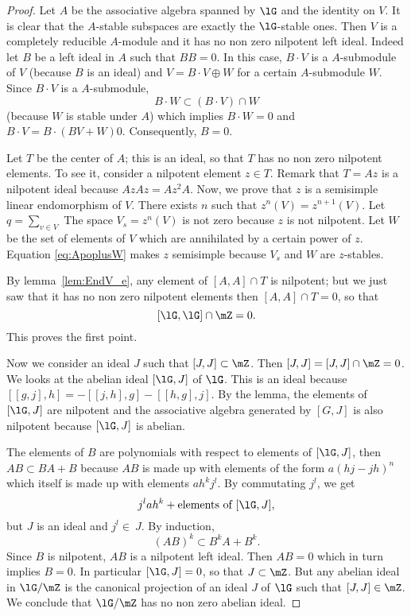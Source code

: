 \begin{proof}
	Let $A$ be the associative algebra spanned by $\lG$ and the identity on $V$. It is clear that the $A$-stable subspaces are exactly the $\lG$-stable ones. Then $V$ is a completely reducible $A$-module and it has no non zero nilpotent left ideal. Indeed let $B$ be a left ideal in $A$ such that $BB=0$. In this case, $B\cdot V$ is a $A$-submodule of $V$ (because $B$ is an ideal) and $V=B\cdot V\oplus W$ for a certain $A$-submodule $W$. Since $B\cdot V$ is a $A$-submodule,
	\[
		B\cdot W\subset(B\cdot V)\cap W
	\]
	(because $W$ is stable under $A$) which implies $B\cdot W=0$ and $B\cdot V=B\cdot(BV+W) 0$. Consequently, $B=0$.

	Let $T$ be the center of $A$; this is an ideal, so that $T$ has no non zero nilpotent elements. To see it, consider a nilpotent element $z\in T$. Remark that $T=Az$  is a nilpotent ideal because $AzAz=Az^2A$. Now, we prove that $z$ is a semisimple linear endomorphism of $V$. There exists \( n\) such that $z^n(V)=z^{n+1}(V)$. Let $q=\sum_{v\in V}$  The space $V_s=z^n(V)$ is not zero because $z$ is not nilpotent. Let $W$ be the set of elements of $V$ which are annihilated by a certain power of $z$. Equation \eqref{eq:ApoplusW} makes $z$ semisimple because $V_s$ and $W$ are $z$-stables.

	By lemma~\ref{lem:EndV_e}, any element of $[A,A]\cap T$ is nilpotent; but we just saw that it has no non zero nilpotent elements then $[A,A]\cap T=0$, so that
	\[
		[\lG,\lG]\cap\mZ=0.
	\]
	This proves the first point.

	Now we consider  an ideal $J$ such that $[J,J]\subset\mZ$. Then $[J,J]=[J,J]\cap \mZ=0$. We looks at the abelian ideal $[\lG,J]$ of $\lG$. This is an ideal because $[[g,j],h]=-[[j,h],g]-[[h,g],j]$. By the lemma, the elements of $[\lG,J]$ are nilpotent and the associative algebra generated by $[G,J]$ is also nilpotent because $[\lG,J]$ is abelian.

	The elements of $B$ are polynomials with respect to elements of $[\lG,J]$, then $AB\subset BA+B$ because $AB$ is made up with elements of the form $a(hj-jh)^n$ which itself is made up with elements $ah^kj^l$. By commutating $j^l$, we get
	\[
		j^lah^k+\text{elements of } [\lG,J],
	\]
	but $J$ is an ideal and $j^l\in\ J$. By induction,
	\begin{equation}
		(AB)^k\subset B^kA+B^k.
	\end{equation}
	Since $B$ is nilpotent, $AB$ is a nilpotent left ideal. Then $AB=0$ which in turn implies $B=0$. In particular $[\lG,J]=0$, so that $J\subset\mZ$. But any abelian ideal in $\lG/\mZ$ is the canonical projection of an ideal $J$ of $\lG$ such that $[J,J]\in\mZ$. We conclude that $\lG/\mZ$ has no non zero abelian ideal.

\end{proof}

